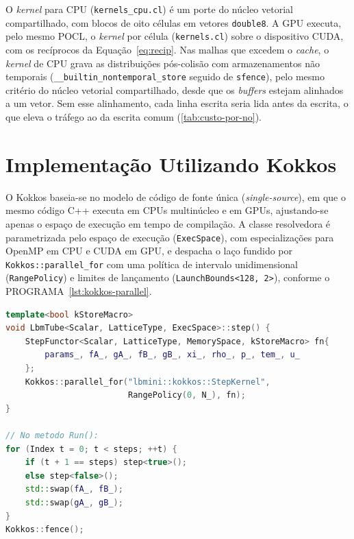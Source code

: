O \textit{kernel} para CPU (\texttt{kernels\_cpu.cl}) é um porte do núcleo vetorial compartilhado, com blocos de oito células em vetores \texttt{double8}.
A GPU executa, pelo mesmo POCL, o \textit{kernel} por célula (\texttt{kernels.cl}) sobre o dispositivo CUDA, com os recíprocos da Equação~\eqref{eq:recip}.
Nas malhas que excedem o \textit{cache}, o \textit{kernel} de CPU grava as distribuições pós-colisão com armazenamentos não temporais (\texttt{\_\_builtin\_\allowbreak nontemporal\_\allowbreak store} seguido de \texttt{sfence}), pelo mesmo critério do núcleo vetorial compartilhado, desde que os \textit{buffers} estejam alinhados a um vetor.
Sem esse alinhamento, cada linha escrita seria lida antes da escrita, o que eleva o tráfego ao da escrita comum (\autoref{tab:custo-por-no}).


\section{Implementação Utilizando Kokkos}\label{sec:implementacao-computacional-utilizando-kokkos}

O Kokkos baseia-se no modelo de código de fonte única (\textit{single-source}), em que o mesmo código C++ executa em CPUs multinúcleo e em GPUs, ajustando-se apenas o espaço de execução em tempo de compilação.
A classe resolvedora é parametrizada pelo espaço de execução (\texttt{ExecSpace}), com especializações para OpenMP em CPU e CUDA em GPU, e despacha o laço fundido por \texttt{Kokkos::parallel\_for} com uma política de intervalo unidimensional (\texttt{RangePolicy}) e limites de lançamento (\texttt{LaunchBounds<128, 2>}), conforme o PROGRAMA~\ref{lst:kokkos-parallel}.

\noindent\begin{minipage}{\linewidth}
\begin{lstlisting}[language=C++, caption={Functor de passo fundido e alternância de Views em Kokkos.}, label={lst:kokkos-parallel}]
template<bool kStoreMacro>
void LbmTube<Scalar, LatticeType, ExecSpace>::step() {
    StepFunctor<Scalar, LatticeType, MemorySpace, kStoreMacro> fn{
        params_, fA_, gA_, fB_, gB_, xi_, rho_, p_, tem_, u_
    };
    Kokkos::parallel_for("lbmini::kokkos::StepKernel",
                         RangePolicy(0, N_), fn);
}

// No metodo Run():
for (Index t = 0; t < steps; ++t) {
    if (t + 1 == steps) step<true>();
    else step<false>();
    std::swap(fA_, fB_);
    std::swap(gA_, gB_);
}
Kokkos::fence();
\end{lstlisting}
\end{minipage}

